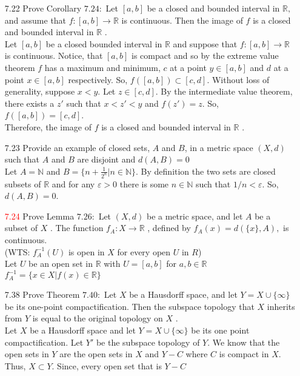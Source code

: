 \documentclass[12pt]{article}
\newcommand{\R}{\mathbb{R}}
\newcommand{\ak}[1]{\textcolor{red}{#1}}
\begin{document}
	\pagestyle{fancy}  
	\lfoot{} \cfoot{} \rfoot{}
	
	\begin{enumerate}
		\item[7.22] Prove Corollary $7.24 :$ Let $[ a , b ]$ be a closed and bounded interval in $\R ,$ and
		assume that $f : [ a , b ] \rightarrow \mathbb { R }$ is continuous. Then the image of $f$ is a closed and
		bounded interval in $\mathbb { R }$ .\\
		Let $[a,b] $ be a closed bounded interval in $ \R $ and suppose that $ f:[a,b]\rightarrow \R $ is continuous. Notice, that $ [a,b] $ is compact and so by the extreme value theorem $ f $ has a maximum and minimum, $ c $ at a point $ y\in[a,b] $ and $ d $ at a point $ x\in[a,b] $ respectively. So, $ f([a,b])\subset [c,d] $. Without loss of generality, suppose $ x<y $. Let $ z\in[c,d] $. By the intermediate value theorem, there exists a $ z' $ such that $ x<z'<y $ and $ f(z')=z $. So, $ f([a,b])=[c,d] $. \\
		Therefore,  the image of $f$ is a closed and
		bounded interval in $\mathbb { R }$ .
		\item[7.23] Provide an example of closed sets, $ A $ and $ B $, in a metric space $ (X,d) $ such that $ A $ and $ B $ are disjoint and $ d(A,B)=0 $\\
		Let $ A = \mathbb{ N } $ and $ B=\{n+\frac{1}{2^n}|n\in\mathbb{ N }\} $. By definition the two sets are closed subsets of $ \R $ and for any $ \varepsilon > 0 $ there is some $ n\in \mathbb{ N } $ such that $ 1/n < \varepsilon $. So, $ d(A,B)= 0 $.
		\item[\ak{7.24}] Prove Lemma $7.26 :$ Let $( X , d )$ be a metric space, and let $A$ be a subset of $X$ .
		The function $f _ { A } : X \rightarrow \mathbb { R }$ , defined by $f _ { A } ( x ) = d ( \{ x \} , A ) ,$ is continuous.\\
		(WTS: $  f_A^{-1}(U) $  is open in $X$ for every open $  U  $  in $ R $)\\
		Let $ U $ be an open set in $ \R $ with $ U=[a,b] $ for $ a,b\in\R $\\
		$f_A^{-1}=\{x\in X|f(x)\in \R\}$
		\item[7.38] Prove Theorem $7.40 :$ Let $X$ be a Hausdorff space, and let $Y = X \cup \{ \infty \}$ be its one-point compactification. Then the subspace topology that $X$ inherits from $Y$ is equal to the original topology on $X$ .\\
		Let $ X $ be a Hausdorff space and let $ Y=X\cup\{\infty\} $ be its one point compactification.  Let $ Y' $ be the subspace topology of $ Y $. We know that the open sets in $ Y $ are the open sets in $ X $ and $ Y-C $ where $ C $ is compact in $ X $. Thus, $ X \subset Y$. Since, every open set that is $ Y-C $
		

\end{enumerate}
\end{document}
